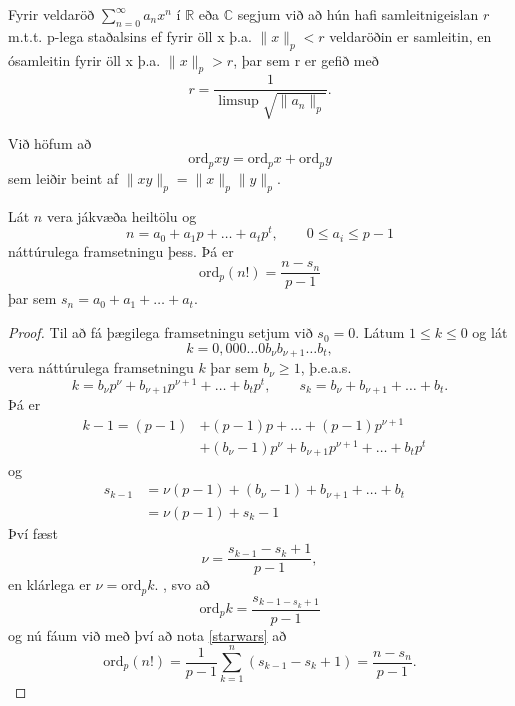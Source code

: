 Fyrir veldaröð $\sum_{n=0}^{\infty} a_nx^n$ í $\mathbb{R}$ eða $\mathbb{C}$ segjum við að hún hafi samleitnigeislan $r$ 
m.t.t. p-lega staðalsins ef fyrir öll x þ.a. $\|x\|_p < r$ veldaröðin er samleitin, en ósamleitin fyrir öll x þ.a. $\|x\|_p > r$, 
þar sem r er gefið með
\begin{equation*}
r = \frac{1}{\limsup \sqrt{\|a_n\|_p }}.
\end{equation*} 

Við höfum að 
\begin{equation}
\label{starwars}
\mbox{ord}_p xy = \mbox{ord}_p x + \mbox{ord}_p y
\end{equation}
sem leiðir beint af $\|xy\|_p = \|x\|_p \|y\|_p$.
\begin{hjalparsetn}
Lát $n$ vera jákvæða heiltölu og 
\begin{equation*}
n = a_0 + a_1p+ \ldots + a_tp^t, \qquad 0\leq a_i \leq p - 1
\end{equation*}
náttúrulega framsetningu þess. Þá er
\begin{equation*}
\mbox{ord}_p(n!) = \frac{n - s_n}{p-1}
\end{equation*}
þar sem $s_n = a_0 + a_1 + \ldots + a_t$.
\end{hjalparsetn}
\begin{proof}
Til að fá þægilega framsetningu setjum við $s_0 = 0$. Látum $1\leq k \leq 0$ og lát
\begin{equation*}
k = 0,0 0 0 \ldots 0 b_\nu b_{\nu + 1} \ldots b_t ,  
\end{equation*}
vera náttúrulega framsetningu $k$ þar sem $b_\nu \geq 1$, þ.e.a.s. 
\begin{equation*}
k = b_\nu p^\nu + b_{\nu +1} p^{\nu+1} + \ldots + b_t p^t, \qquad s_k = b_\nu + b_{\nu+1} + \ldots + b_t.
\end{equation*}
Þá er 
\begin{align*}
k-1 = (p-1) & + (p-1)p + \ldots + (p-1)p^{\nu +1} &\\
 & + (b_\nu -1)p^\nu + b_{\nu+1} p^{\nu +1} + \ldots + b_t p^t &
\end{align*}
og 
\begin{align*}
s_{k-1} &= \nu(p-1) + (b_\nu -1) + b_{\nu+1} + \ldots + b_t & \\
 &  = \nu(p-1) + s_k -1 &
\end{align*}
Því fæst
\begin{equation*}
\nu = \frac{s_{k-1}-s_k + 1}{p-1 },
\end{equation*}
en klárlega er $\nu = \mbox{ord}_p k.$ , svo að
\begin{equation*}
\mbox{ord}_p k = \frac{s_{k-1 - s_k +1}}{p-1}
\end{equation*}
og nú fáum við með því að nota \ref{starwars} að 
\begin{equation*}
\mbox{ord}_p(n!) = \frac{1}{p-1} \sum_{k=1}^n (s_{k-1} - s_k +1) = \frac{n - s_n}{p-1}.
\end{equation*}
\end{proof}

